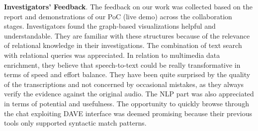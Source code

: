 


\textbf{Investigators' Feedback}. The feedback on our work was collected based on the report and demonstrations of our PoC (live demo) across the collaboration stages.
Investigators found the graph-based visualizations helpful and understandable. They are familiar with these structures because of the relevance of relational knowledge in their investigations. The combination of text search with relational queries was appreciated. In relation to multimedia data enrichment, they believe that speech-to-text could be really transformative in terms of speed and effort balance.
They have been quite surprised by the quality of the transcriptions and not concerned by occasional mistakes, as they always verify the evidence against the original audio. 
The NLP part was also appreciated in terms of potential and usefulness. The opportunity to quickly browse through the chat exploiting DAVE interface was deemed promising because their previous tools only supported syntactic match patterns.           

